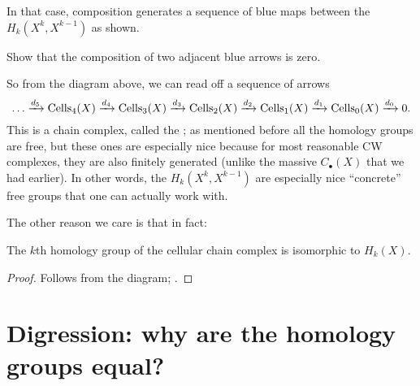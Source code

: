 In that case, composition generates a sequence of blue maps
between the $H_k(X^k, X^{k-1})$ as shown.
\begin{ques}
	Show that the composition of two adjacent blue arrows is zero.
\end{ques}

So from the diagram above, we can read off a sequence of arrows
\[
	\dots \xrightarrow{d_5} \operatorname{Cells}_4(X)  \xrightarrow{d_4} \operatorname{Cells}_3(X)
	\xrightarrow{d_3} \operatorname{Cells}_2(X) \xrightarrow{d_2} \operatorname{Cells}_1(X)
	\xrightarrow{d_1} \operatorname{Cells}_0(X) \xrightarrow{d_0} 0.
\]
This is a chain complex, called the ;
as mentioned before all the homology groups are free,
but these ones are especially nice because for most reasonable CW complexes,
they are also finitely generated
(unlike the massive $C_\bullet(X)$ that we had earlier).
In other words, the $H_k(X^k, X^{k-1})$ are especially nice ``concrete'' free groups
that one can actually work with.

The other reason we care is that in fact:
\begin{theorem}
	\label{thm:cellular_chase}
	The $k$th homology group of the cellular chain complex
	is isomorphic to $H_k(X)$.
\end{theorem}
\begin{proof}
	Follows from the diagram; .
\end{proof}

\section{Digression: why are the homology groups equal?}
\label{sec:homology_group_equal}

